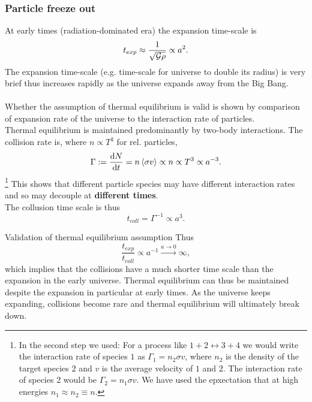 \subsubsection{Particle freeze out}
At early times (radiation-dominated era) the expansion time-scale is
\begin{equation}
	t_{exp} \approx \frac{1}{\sqrt{\mathcal{G} \rho}}\propto a^2.
\end{equation}
The expansion time-scale (e.g. time-scale for universe to double its radius) is very brief thus increases rapidly as the universe expands away from the Big Bang.\\
\\
Whether the assumption of thermal equilibrium is valid is shown by comparison of expansion rate of the universe to the interaction rate of particles.\\
Thermal equilibrium is maintained predominantly by two-body interactions. The collision rate is, where $n\propto T^3$ for rel. particles, 
\begin{equation}
	\Gamma:= \frac{\mathrm{d} N}{\mathrm{d} t}= n \expval{\sigma v} \propto n \propto T^3 \propto a^{-3}. 
	\end{equation}
	\footnote{In the second step we used: For a process like $1+2\leftrightarrow 3+4$ we would write the interaction rate of species $1$ as $\Gamma_1=n_2 \sigma v$, where $n_2$ is the density of the target species $2$ and $v$ is the average velocity of $1$ and $2$. The interaction rate of species $2$ would be $\Gamma_2=n_1 \sigma v$. We have used the epxectation that at high energies $n_1 \approx n_2 \equiv n$.}
This shows that different particle species may have different interaction rates and so may decouple at \textbf{different times}.\\
The collusion time scale is thus
\begin{equation}
	t_{coll} = \Gamma^{-1} \propto a^3.
\end{equation}
\begin{mybox}{Validation of thermal equilibrium assumption}
Thus
\begin{equation}
	\frac{t_{exp}}{t_{coll}} \propto a^{-1} \stackrel{a\rightarrow 0}{\longrightarrow} \infty,
\end{equation}
which implies that the collisions have a much shorter time scale than the expansion in the early universe. Thermal equilibrium can thus be maintained despite the expansion in particular at early times. As the universe keeps expanding, collisions become rare and thermal equilibrium will ultimately break down.
\end{mybox}
